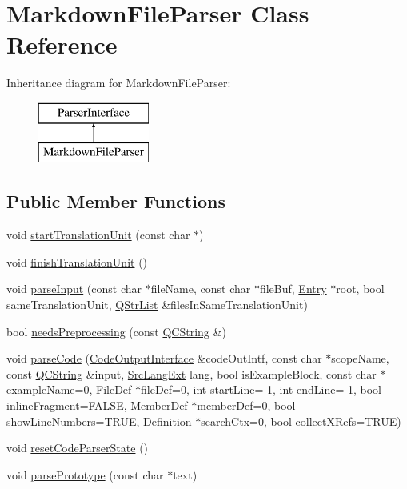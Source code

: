 \hypertarget{class_markdown_file_parser}{}\section{Markdown\+File\+Parser Class Reference}
\label{class_markdown_file_parser}
Inheritance diagram for Markdown\+File\+Parser\+:\begin{figure}[H]
\begin{center}
\leavevmode
\includegraphics[height=2.000000cm]{class_markdown_file_parser}
\end{center}
\end{figure}
\subsection*{Public Member Functions}
\begin{DoxyCompactItemize}
\item 
void \mbox{\hyperlink{class_markdown_file_parser_a82d0d8fad0f6772a9862eb3d9190127d}{start\+Translation\+Unit}} (const char $\ast$)
\item 
void \mbox{\hyperlink{class_markdown_file_parser_adaf4aeedc27abe4dd8cc4a58d59b298f}{finish\+Translation\+Unit}} ()
\item 
void \mbox{\hyperlink{class_markdown_file_parser_a56e4994924ce8ac7710e2a1da0f98807}{parse\+Input}} (const char $\ast$file\+Name, const char $\ast$file\+Buf, \mbox{\hyperlink{class_entry}{Entry}} $\ast$root, bool same\+Translation\+Unit, \mbox{\hyperlink{class_q_str_list}{Q\+Str\+List}} \&files\+In\+Same\+Translation\+Unit)
\item 
bool \mbox{\hyperlink{class_markdown_file_parser_ae53b811156b426b03f4ea8f634141133}{needs\+Preprocessing}} (const \mbox{\hyperlink{class_q_c_string}{Q\+C\+String}} \&)
\item 
void \mbox{\hyperlink{class_markdown_file_parser_a4413366ce7b6f7e41a2b232ce2ad6170}{parse\+Code}} (\mbox{\hyperlink{class_code_output_interface}{Code\+Output\+Interface}} \&code\+Out\+Intf, const char $\ast$scope\+Name, const \mbox{\hyperlink{class_q_c_string}{Q\+C\+String}} \&input, \mbox{\hyperlink{types_8h_a9974623ce72fc23df5d64426b9178bf2}{Src\+Lang\+Ext}} lang, bool is\+Example\+Block, const char $\ast$example\+Name=0, \mbox{\hyperlink{class_file_def}{File\+Def}} $\ast$file\+Def=0, int start\+Line=-\/1, int end\+Line=-\/1, bool inline\+Fragment=F\+A\+L\+SE, \mbox{\hyperlink{class_member_def}{Member\+Def}} $\ast$member\+Def=0, bool show\+Line\+Numbers=T\+R\+UE, \mbox{\hyperlink{class_definition}{Definition}} $\ast$search\+Ctx=0, bool collect\+X\+Refs=T\+R\+UE)
\item 
void \mbox{\hyperlink{class_markdown_file_parser_a78b5337fc2b6a6dd1ee5ce104005e566}{reset\+Code\+Parser\+State}} ()
\item 
void \mbox{\hyperlink{class_markdown_file_parser_a5579fefcfe5512e79abfe55fd508fc95}{parse\+Prototype}} (const char $\ast$text)
\end{DoxyCompactItemize}


